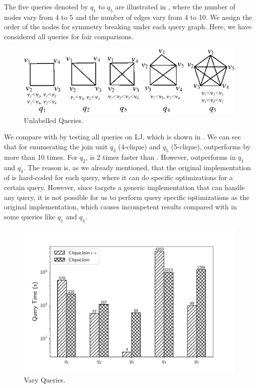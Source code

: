  The five queries denoted by $q_1$ to $q_5$ are illustrated in , where the number of nodes vary from 4 to 5 and the number of edges vary from 4 to 10. We assign the order of the nodes for symmetry breaking\cite{Grochow2007} under each query graph. Here, we have considered all queries for fair comparisons.

\begin{figure}[htb]
  \centering
  \includegraphics[scale=0.6]{figures/unlq.eps}
  \caption{\small{Unlabelled Queries.}}
  \label{fig:unlq}
\end{figure}

 We compare \gencliqjoin with \cliquejoin by testing all queries on LJ, which is shown in . We can see that for enumerating the join unit $q_3$ (4-clique) and $q_5$ (5-clique), \gencliqjoin outperforms \cliquejoin by more than 10 times. For $q_2$, \gencliqjoin is 2 times faster than \cliquejoin. However, \cliquejoin outperforms \gencliqjoin in $q_1$ and $q_4$. The reason is, as we already mentioned, that the original implementation of \cliquejoin is hard-coded for each query, where it can do specific optimizations for a certain query. However, since \gencliqjoin targets a generic implementation that can handle any query, it is not possible for us to perform query specific optimizations as the original implementation, which causes incompetent results compared with \cliquejoin in some queries like $q_1$ and $q_4$.

\begin{figure}[htb]
  \centering
  \includegraphics[scale=0.4]{figures/exp1.pdf}
  \caption{\small{Vary Queries.}}
  \label{fig:vary_query}
\end{figure}


